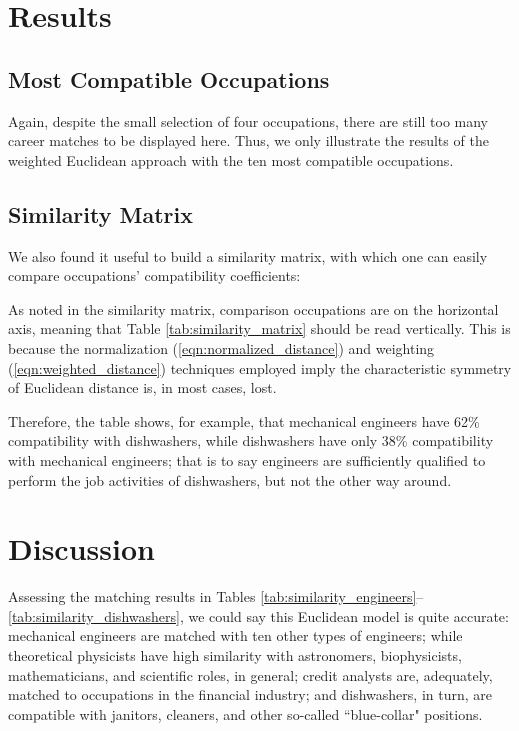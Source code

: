 \documentclass{article}
\begin{document}
\section{Results}

\subsection{Most Compatible Occupations}
Again, despite the small selection of four occupations, there are still too
many career matches to be displayed here. Thus, we only illustrate the results
of the weighted Euclidean approach with the ten most compatible occupations.
\MatchesEngineers \MatchesPhysicists \MatchesCreditAnalysts \MatchesDishwashers

\subsection{Similarity Matrix}
We also found it useful to build a similarity matrix, with which one can easily
compare occupations' compatibility coefficients: \SimilarityMatrix

As noted in the similarity matrix, comparison occupations are on the horizontal
axis, meaning that Table \ref{tab:similarity_matrix} should be read vertically.
This is because the normalization (\ref{eqn:normalized_distance}) and weighting
(\ref{eqn:weighted_distance}) techniques employed imply the characteristic
symmetry of Euclidean distance is, in most cases, lost.

Therefore, the table shows, for example, that mechanical engineers have 62\%
compatibility with dishwashers, while dishwashers have only 38\% compatibility
with mechanical engineers; that is to say engineers are sufficiently qualified
to perform the job activities of dishwashers, but not the other way around.

\section{Discussion}
Assessing the matching results in Tables
\ref{tab:similarity_engineers}--\ref{tab:similarity_dishwashers}, we could say
this Euclidean model is quite accurate: mechanical engineers are matched with
ten other types of engineers; while theoretical physicists have high similarity
with astronomers, biophysicists, mathematicians, and scientific roles, in
general; credit analysts are, adequately, matched to occupations in the
financial industry; and dishwashers, in turn, are compatible with janitors,
cleaners, and other so-called ``blue-collar" positions.
\end{document}
